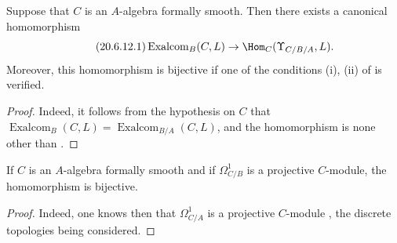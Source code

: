 \begin{corollary}[20.6.12]
\label{0.20.6.12}
Suppose that $C$ is an $A$-algebra formally smooth.
Then there exists a canonical homomorphism
\begin{equation}
\tag{20.6.12.1}
  \label{0.20.6.12.1}
  \operatorname{Exalcom}_B(C,L)\to\Hom_C(\Upsilon_{C/B/A},L).
\end{equation}
Moreover, this homomorphism is bijective if one of the conditions \textup{(i)}, \textup{(ii)} of  is verified.
\end{corollary}

\begin{proof}
Indeed, it follows from the hypothesis on $C$ that $\operatorname{Exalcom}_B(C,L)=\operatorname{Exalcom}_{B/A}(C,L)$, and the homomorphism  is none other than .
\end{proof}

\begin{corollary}[20.6.13]
\label{0.20.6.13}
If $C$ is an $A$-algebra formally smooth and if $\Omega^1_{C/B}$ is a projective $C$-module, the homomorphism  is bijective.
\end{corollary}

\begin{proof}
Indeed, one knows then that $\Omega^1_{C/A}$ is a projective $C$-module , the discrete topologies being considered.
\end{proof}

